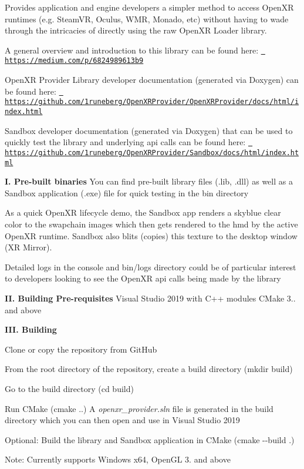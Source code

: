 Provides application and engine developers a simpler method to access Open\+XR runtimes (e.\+g. Steam\+VR, Oculus, W\+MR, Monado, etc) without having to wade through the intricacies of directly using the raw Open\+XR Loader library.

A general overview and introduction to this library can be found here\+: \href{https://medium.com/p/6824989613b9}{\texttt{ https\+://medium.\+com/p/6824989613b9}}

Open\+XR Provider Library developer documentation (generated via Doxygen) can be found here\+: \href{https://github.com/1runeberg/OpenXRProvider/OpenXRProvider/docs/html/index.html}{\texttt{ https\+://github.\+com/1runeberg/\+Open\+X\+R\+Provider/\+Open\+X\+R\+Provider/docs/html/index.\+html}}

Sandbox developer documentation (generated via Doxygen) that can be used to quickly test the library and underlying api calls can be found here\+: \href{https://github.com/1runeberg/OpenXRProvider/Sandbox/docs/html/index.html}{\texttt{ https\+://github.\+com/1runeberg/\+Open\+X\+R\+Provider/\+Sandbox/docs/html/index.\+html}}

{\bfseries{I. Pre-\/built binaries}} You can find pre-\/built library files (.lib, .dll) as well as a Sandbox application (.exe) file for quick testing in the {\ttfamily bin} directory

As a quick Open\+XR lifecycle demo, the Sandbox app renders a skyblue clear color to the swapchain images which then gets rendered to the hmd by the active Open\+XR runtime. Sandbox also blits (copies) this texture to the desktop window (XR Mirror).

Detailed logs in the console and {\ttfamily bin/logs} directory could be of particular interest to developers looking to see the Open\+XR api calls being made by the library

{\bfseries{II. Building Pre-\/requisites}} Visual Studio 2019 with C++ modules C\+Make 3.. and above

{\bfseries{I\+II. Building}}
\begin{DoxyEnumerate}
\item Clone or copy the repository from Git\+Hub
\item From the root directory of the repository, create a build directory ({\ttfamily mkdir build})
\item Go to the build directory ({\ttfamily cd build})
\item Run C\+Make ({\ttfamily cmake ..}) A {\itshape openxr\+\_\+provider.\+sln} file is generated in the build directory which you can then open and use in Visual Studio 2019
\item Optional\+: Build the library and Sandbox application in C\+Make ({\ttfamily cmake -\/-\/build .})
\end{DoxyEnumerate}

Note\+: Currently supports Windows x64, Open\+GL 3. and above 